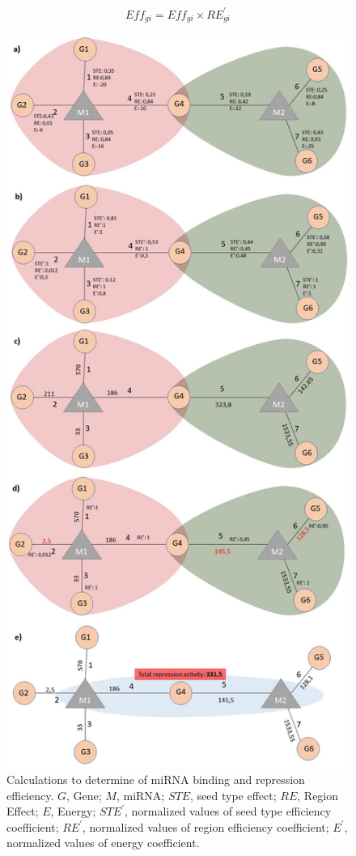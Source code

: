\documentclass[a4,center,fleqn]{NAR}
\begin{document}
\begin{equation}
Eff_{gi}= Eff_{gi}\times RE^\prime_{gi} \tag{4}\label{eq:4}
\end{equation}

\begin{figure}
\hypertarget{fig2}{%
\centering
\includegraphics{fig2.jpg}
\caption{Calculations to determine of miRNA binding and repression
efficiency. \(G\), Gene; \(M\), miRNA; \(STE\), seed type effect;
\(RE\), Region Effect; \(E\), Energy; \(STE^\prime\), normalized values
of seed type efficiency coefficient; \(RE^\prime\), normalized values of
region efficiency coefficient; \(E^\prime\), normalized values of energy
coefficient.}\label{fig2}
}
\end{figure}
\end{document}
